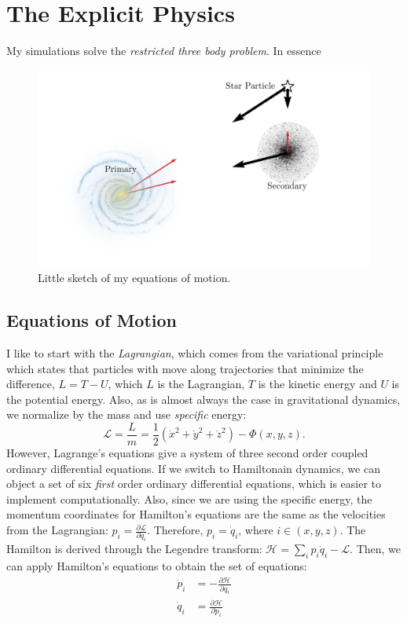\section{The Explicit Physics}
    My simulations solve the \textit{restricted three body problem}. In essence
    \begin{figure}
        \centering
        \includegraphics[width=\linewidth]{images/restricted_three_body_set_up.png}
        \caption{Little sketch of my equations of motion. }
    \end{figure}
    
    \subsection{Equations of Motion} \label{subsec:myEquationsOfMotion}
        I like to start with the \textit{Lagrangian}, which comes from the variational principle which states that particles with move along trajectories that minimize the difference, $ L = T-U $, which $L$ is the Lagrangian, $T$ is the kinetic energy and $U$ is the potential energy. Also, as is almost always the case in gravitational dynamics, we normalize by the mass and use \textit{specific} energy: 
        \begin{equation}
            \mathcal{L} = \frac{L}{m} = \frac{1}{2}\left(\dot{x}^2+\dot{y}^2+\dot{z}^2\right) - \Phi(x,y,z).
        \end{equation}
        However, Lagrange's equations give a system of three second order coupled ordinary differential equations. If we switch to Hamiltonain dynamics, we can object a set of six \textit{first} order ordinary differential equations, which is easier to implement computationally. Also, since we are using the specific energy, the momentum coordinates for Hamilton's equations are the same as the velocities from the Lagrangian: $ p_i = \frac{\partial \mathcal{L}}{\partial \dot{q}_i}$. Therefore, $p_i = \dot{q}_i$, where $i \in \left(x,y,z\right)$. The Hamilton is derived through the Legendre transform: $ \mathcal{H}=\sum_i p_i\dot{q}_i - \mathcal{L}$. Then, we can apply Hamilton's equations to obtain the set of equations: 
        \begin{align}
            \dot{p}_i &= -\frac{\partial \mathcal{H}}{\partial q_i} \\
            \dot{q}_i &= \frac{\partial \mathcal{H}}{\partial p_i}
        \end{align}

